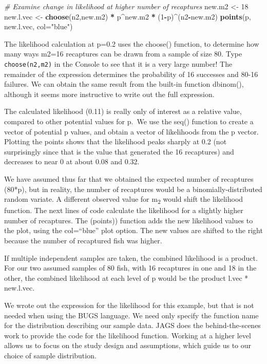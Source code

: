 \documentclass[
]{krantz}
\makeatletter
\newenvironment{Shaded}{\begin{snugshade}}{\end{snugshade}}
\newcommand{\AttributeTok}[1]{\textcolor[rgb]{0.27,0.27,0.27}{#1}}
\newcommand{\CommentTok}[1]{\textcolor[rgb]{0.37,0.37,0.37}{\textit{#1}}}
\newcommand{\DecValTok}[1]{\textcolor[rgb]{0.06,0.06,0.06}{#1}}
\newcommand{\FunctionTok}[1]{\textcolor[rgb]{0.27,0.27,0.27}{\textbf{#1}}}
\newcommand{\NormalTok}[1]{#1}
\newcommand{\OtherTok}[1]{\textcolor[rgb]{0.37,0.37,0.37}{#1}}
\newcommand{\SpecialCharTok}[1]{\textcolor[rgb]{0.43,0.43,0.43}{\textbf{#1}}}
\newcommand{\StringTok}[1]{\textcolor[rgb]{0.5,0.5,0.5}{#1}}
\newenvironment{kframe}{%
\medskip{}
\setlength{\fboxsep}{.8em}
 \def\at@end@of@kframe{}%
 \ifinner\ifhmode%
  \def\at@end@of@kframe{\end{minipage}}%
  \begin{minipage}{\columnwidth}%
 \fi\fi%
 \def\FrameCommand##1{\hskip\@totalleftmargin \hskip-\fboxsep
 \colorbox{shadecolor}{##1}\hskip-\fboxsep
     \hskip-\linewidth \hskip-\@totalleftmargin \hskip\columnwidth}%
 \MakeFramed {\advance\hsize-\width
   \@totalleftmargin\z@ \linewidth\hsize
   \@setminipage}}%
 {\par\unskip\endMakeFramed%
 \at@end@of@kframe}
\renewenvironment{Shaded}{\begin{kframe}}{\end{kframe}}
\makeatother
\begin{document}
\begin{Shaded}
\begin{Highlighting}[]
\CommentTok{\# Examine change in likelihood at higher number of recaptures}
\NormalTok{new.m2 }\OtherTok{\textless{}{-}} \DecValTok{18}
\NormalTok{new.l.vec }\OtherTok{\textless{}{-}} \FunctionTok{choose}\NormalTok{(n2,new.m2) }\SpecialCharTok{*}\NormalTok{ p}\SpecialCharTok{\^{}}\NormalTok{new.m2 }\SpecialCharTok{*}\NormalTok{ (}\DecValTok{1}\SpecialCharTok{{-}}\NormalTok{p)}\SpecialCharTok{\^{}}\NormalTok{(n2}\SpecialCharTok{{-}}\NormalTok{new.m2)}
\FunctionTok{points}\NormalTok{(p, new.l.vec, }\AttributeTok{col=}\StringTok{"blue"}\NormalTok{)}
\end{Highlighting}
\end{Shaded}

The likelihood calculation at p=0.2 uses the choose() function, to determine how many ways m2=16 recaptures can be drawn from a sample of size 80. Type \texttt{choose(n2,m2)} in the Console to see that it is a very large number! The remainder of the expression determines the probability of 16 successes and 80-16 failures. We can obtain the same result from the built-in function dbinom(), although it seems more instructive to write out the full expression.

The calculated likelihood (0.11) is really only of interest as a relative value, compared to other potential values for p.~We use the seq() function to create a vector of potential p values, and obtain a vector of likelihoods from the p vector. Plotting the points shows that the likelihood peaks sharply at 0.2 (not surprisingly since that is the value that generated the 16 recaptures) and decreases to near 0 at about 0.08 and 0.32.

We have assumed thus far that we obtained the expected number of recaptures (80*p), but in reality, the number of recaptures would be a binomially-distributed random variate. A different observed value for m\textsubscript{2} would shift the likelihood function. The next lines of code calculate the likelihood for a slightly higher number of recaptures. The (points)) function adds the new likelihood values to the plot, using the col=``blue'' plot option. The new values are shifted to the right because the number of recaptured fish was higher.

If multiple independent samples are taken, the combined likelihood is a product. For our two assumed samples of 80 fish, with 16 recaptures in one and 18 in the other, the combined likelihood at each level of p would be the product l.vec * new.l.vec.

We wrote out the expression for the likelihood for this example, but that is not needed when using the BUGS language. We need only specify the function name for the distribution describing our sample data. JAGS does the behind-the-scenes work to provide the code for the likelihood function. Working at a higher level allows us to focus on the study design and assumptions, which guide us to our choice of sample distribution.
\end{document}
